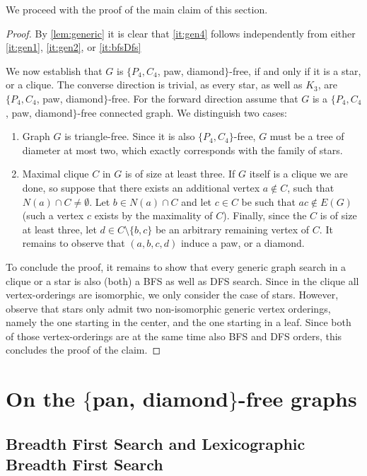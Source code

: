 \documentclass{svproc}
\begin{document}
We proceed with the proof of the main claim of this section.
\thmGENdfsBFS*
\begin{proof}
By \cref{lem:generic} it is clear that 
\cref{it:gen4} follows independently from either 
\cref{it:gen1}, \ref{it:gen2}, or \ref{it:bfsDfs}
 
We now establish that $G$ is $\{P_4, C_4$, paw, diamond$\}$-free, if and only if it is a star, or a clique. The converse direction is trivial, as 
every star, as well as $K_3$, are $\{P_4, C_4$, paw, diamond$\}$-free. 
For the forward direction  assume that $G$ is a $\{P_4, C_4$, paw, diamond$\}$-free connected graph. We distinguish two cases:
\begin{enumerate}
    \item Graph $G$ is triangle-free. Since it is also 
    $\{P_4, C_4\}$-free, $G$ must be a tree of diameter at most two, which exactly corresponds with the family of stars.
    \item Maximal clique $C$ in $G$ is of size at least three. If $G$ itself is a clique we are done, so suppose that there exists an additional vertex $a\notin C$, such that $N(a)\cap C\neq \emptyset$. Let $b\in N(a)\cap C$ and let $c\in C$ be such that $ac\notin E(G)$ (such a vertex $c$ exists by the maximality of $C$). Finally, since the $C$ is of size at least three, let $d\in C\setminus \{b,c\}$ be an arbitrary remaining vertex of $C$. It remains to observe that $(a,b,c,d)$ induce a paw, or a diamond. 
\end{enumerate}
To conclude the proof, it remains to show that every generic graph search in a clique or a star is also (both) a BFS as well as DFS search. Since in the clique all vertex-orderings are isomorphic, we only consider the case of stars. 
However, observe that stars only admit two non-isomorphic generic vertex orderings, namely the one starting in the center, and the one starting in a leaf. Since both of those vertex-orderings are at the same time also BFS and DFS orders, this concludes the proof of the claim. 
\end{proof}


\iflong

\section{On the $\{$pan, diamond$\}$-free graphs}\label{sec:pan-diamond}

\subsection{Breadth First Search and Lexicographic Breadth First Search}
\end{document}

